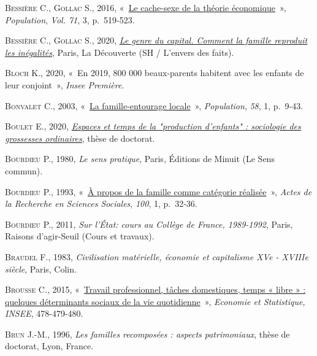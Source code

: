\documentclass[
  12pt,
]{book}
\newlength{\cslhangindent}
\newenvironment{CSLReferences}[2] %
 {\begin{list}{}{%
  \setlength{\itemindent}{0pt}
  \setlength{\leftmargin}{0pt}
  \setlength{\parsep}{0pt}
  \ifodd #1
   \setlength{\leftmargin}{\cslhangindent}
   \setlength{\itemindent}{-1\cslhangindent}
  \fi
  \setlength{\itemsep}{#2\baselineskip}}}
 {\end{list}}
\begin{document}
\begin{CSLReferences}{0}{1}
\textsc{Bessière C.}, \textsc{Gollac S.}, 2016,
{«~\href{https://www.cairn.info/revue-population-2016-3-page-519.htm}{Le
cache-sexe de la théorie économique}~»}, \emph{Population}, \emph{Vol.
71}, 3, p.~519‑523.

\textsc{Bessière C.}, \textsc{Gollac S.}, 2020,
\emph{\href{https://www.cairn.info/le-genre-du-capital--9782348044380.htm}{Le
genre du capital. Comment la famille reproduit les inégalités}}, Paris,
La Découverte (SH / L'envers des faits).

\textsc{Bloch K.}, 2020, {«~En 2019, 800 000 beaux-parents habitent avec
les enfants de leur conjoint~»}, \emph{Insee Première}.

\textsc{Bonvalet C.}, 2003,
{«~\href{https://doi.org/10.3917/popu.301.0009}{La famille-entourage
locale}~»}, \emph{Population}, \emph{58}, 1, p.~9‑43.

\textsc{Boulet E.}, 2020,
\emph{\href{https://theses.fr/2020LYSE2034}{Espaces et temps de la
{"}production d'enfants{"} : sociologie des grossesses ordinaires}},
thèse de doctorat.

\textsc{Bourdieu P.}, 1980, \emph{Le sens pratique}, Paris, Éditions de
Minuit (Le Sens commun).

\textsc{Bourdieu P.}, 1993,
{«~\href{https://doi.org/10.3406/arss.1993.3070}{À propos de la famille
comme catégorie réalisée}~»}, \emph{Actes de la Recherche en Sciences
Sociales}, \emph{100}, 1, p.~32‑36.

\textsc{Bourdieu P.}, 2011, \emph{Sur l'État: cours au Collège de
France, 1989-1992}, Paris, Raisons d'agir-Seuil (Cours et travaux).

\textsc{Braudel F.}, 1983, \emph{Civilisation matérielle, économie et
capitalisme XVe - XVIIIe siècle}, Paris, Colin.

\textsc{Brousse C.}, 2015,
{«~\href{https://www.insee.fr/fr/statistiques/1303226?sommaire=1303240}{Travail
professionnel, tâches domestiques, temps « libre » : quelques
déterminants sociaux de la vie quotidienne}~»}, \emph{Economie et
Statistique, INSEE}, 478-479-480.

\textsc{Brun J.-M.}, 1996, \emph{Les familles recomposées : aspects
patrimoniaux}, thèse de doctorat, Lyon, France.


\end{CSLReferences}
\end{document}
